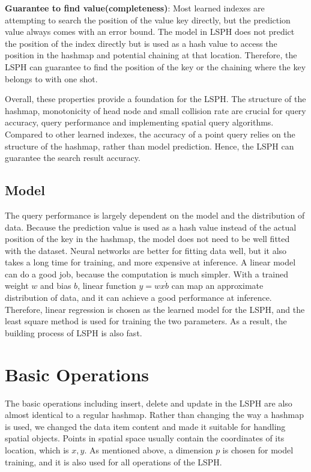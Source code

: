 \textbf{Guarantee to find value(completeness)}: Most learned indexes are attempting to search the position of the value key directly, but the prediction value always comes with an error bound. The model in LSPH does not predict the position of the index directly but is used as a hash value to access the position in the hashmap and potential chaining at that location. Therefore, the LSPH can guarantee to find the position of the key or the chaining where the key belongs to with one shot. 


Overall, these properties provide a foundation for the LSPH. The structure of the hashmap, monotonicity of head node and small collision rate are crucial for query accuracy, query performance and implementing spatial query algorithms. Compared to other learned indexes, the accuracy of a point query relies on the structure of the hashmap, rather than model prediction. Hence, the LSPH can guarantee the search result accuracy. 

\subsection{Model}
The query performance is largely dependent on the model and the distribution of data. Because the prediction value is used as a hash value instead of the actual position of the key in the hashmap, the model does not need to be well fitted with the dataset. Neural networks are better for fitting data well, but it also takes a long time for training, and more expensive at inference. A linear model can do a good job, because the computation is much simpler. With a trained weight $w$ and bias $b$, linear function $y = wx \dot b$ can map an approximate distribution of data, and it can achieve a good performance at inference. Therefore, linear regression is chosen as the learned model for the LSPH, and the least square method is used for training the two parameters. As a result, the building process of LSPH is also fast. 


\section{Basic Operations}
The basic operations including insert, delete and update in the LSPH are also almost identical to a regular hashmap. Rather than changing the way a hashmap is used, we changed the data item content and made it suitable for handling spatial objects. Points in spatial space usually contain the coordinates of its location, which is ${x, y}$. As mentioned above, a dimension $p$ is chosen for model training, and it is also used for all operations of the LSPH. 


